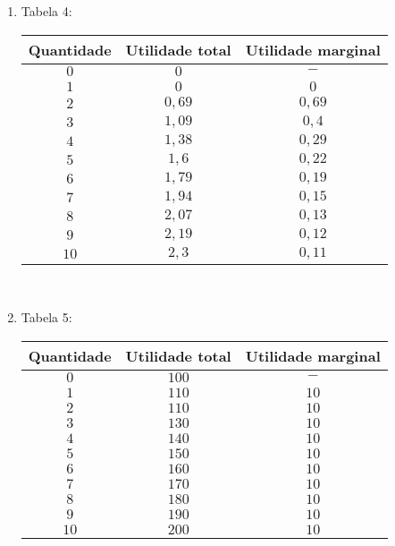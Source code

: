 \documentclass[a4paper, 12pt]{article}
\begin{document}
\begin{enumerate}
\begin{enumerate}
		\item Tabela 4:
		\begin{table}[H]
			\centering
			\begin{tabular}{|c|c|c|}
				\hline
				Quantidade & Utilidade total & Utilidade marginal \\ \hline
				$0$ & $0$ & $-$\\ \hline
				$1$ & $0$ & $0$\\ \hline
				$2$ & $0,69$ & $0,69$\\ \hline
				$3$ & $1,09$ & $0,4$\\ \hline
				$4$ & $1,38$ & $0,29$\\ \hline
				$5$ & $1,6$ & $0,22$\\ \hline
				$6$ & $1,79$ & $0,19$\\ \hline
				$7$ & $1,94$ & $0,15$\\ \hline
				$8$ & $2,07$ & $0,13$\\ \hline
				$9$ & $2,19$ & $0,12$\\ \hline
				$10$ & $2,3$ & $0,11$\\ \hline
			\end{tabular}
		\end{table}\\
		
		\item Tabela 5:
		\begin{table}[H]
		\centering
			\begin{tabular}{|c|c|c|}
				\hline
				Quantidade & Utilidade total & Utilidade marginal \\ \hline
				$0$ & $100$ & $-$\\ \hline
				$1$ & $110$ & $10$\\ \hline
				$2$ & $110$ & $10$\\ \hline
				$3$ & $130$ & $10$\\ \hline
				$4$ & $140$ & $10$\\ \hline
				$5$ & $150$ & $10$\\ \hline
				$6$ & $160$ & $10$\\ \hline
				$7$ & $170$ & $10$\\ \hline
				$8$ & $180$ & $10$\\ \hline
				$9$ & $190$ & $10$\\ \hline
				$10$ & $200$ & $10$\\ \hline
			\end{tabular}
		\end{table}\\
		\newpage
		

\end{enumerate}
\end{enumerate}
\end{document}

